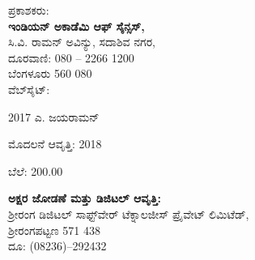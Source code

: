

\begin{flushleft}
ಪ್ರಕಾಶಕರು:\\\textbf{ಇಂಡಿಯನ್ ಅಕಾಡೆಮಿ ಆಫ್ ಸೈನ್ಸಸ್,}\\
 ಸಿ.ವಿ. ರಾಮನ್ ಅವಿನ್ಯು, ಸದಾಶಿವ ನಗರ,\\
 ದೂರವಾಣಿ: 080 – 2266 1200\\
 ಬೆಂಗಳೂರು 560 080\\
 ವೆಬ್‍ಸೈಟ್: 
\end{flushleft}

\vfill

\noindent {} 2017 ಎ. ಜಯರಾಮನ್

\noindent ಮೊದಲನೆ ಆವೃತ್ತಿ: 2018

\noindent ಬೆಲೆ: 200.00

\vfill

\begin{flushleft}
 \textbf{ಅಕ್ಷರ ಜೋಡಣೆ ಮತ್ತು ಡಿಜಿಟಲ್ ಆವೃತ್ತಿ:}\\
 ಶ‍್ರೀರಂಗ ಡಿಜಿಟಲ್ ಸಾಫ್ಟ್‌ವೇರ್ ಟೆಕ್ನಾಲಜೀಸ್ ಪ್ರೈವೇಟ್ ಲಿಮಿಟೆಡ್,\\
 ಶ‍್ರೀರಂಗಪಟ್ಟಣ 571 438\\ 
 ದೂ: (08236)–292432
\end{flushleft}

